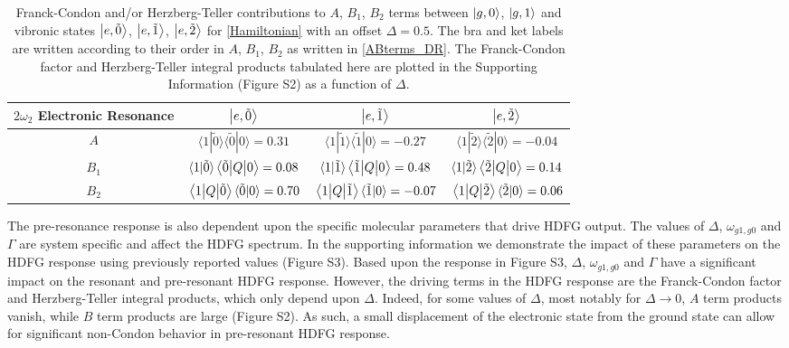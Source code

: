 \documentclass[aip, jcp, reprint, onecolumn, nofootinbib]{revtex4-2}
\begin{document}
\begin{table}[!htbp]
	\caption{\label{T:contributions} Franck-Condon and/or Herzberg-Teller contributions to $A$, $B_1$, $B_2$ terms between $\ket{g,0}$, $\ket{g,1}$ and vibronic states $\ket{e,\tilde{0}}$, $\ket{e,\tilde{1}}$, $\ket{e,\tilde{2}}$ for \autoref{Hamiltonian} with an offset $\Delta = 0.5$.
	The bra and ket labels are written according to their order in $A$, $B_1$, $B_2$ as written in \autoref{ABterms_DR}.
	The Franck-Condon factor and Herzberg-Teller integral products tabulated here are plotted in the Supporting Information (Figure S2) as a function of $\Delta$.}
	\begin{ruledtabular}
		\begin{tabular}{cccc}\label{fcht}
			$2\omega_2$ Electronic Resonance & $\ket{e,\tilde{0}}$ & $\ket{e,\tilde{1}}$ & $\ket{e,\tilde{2}}$\\
			\hline  
			$A$ 
			& $\langle 1 | \tilde{0} \rangle \langle \tilde{0} | 0 \rangle = 0.31 $  
			& $\langle 1 | \tilde{1} \rangle \langle \tilde{1} | 0 \rangle = -0.27 $ 
			& $\langle 1 | \tilde{2} \rangle \langle \tilde{2} | 0 \rangle = -0.04$\\
					
			$B_1$ 
			& $\langle 1 | \tilde{0} \rangle \mel{\tilde{0}}{Q}{0} = 0.08$ 
			& $\langle 1 | \tilde{1} \rangle \mel{\tilde{1}}{Q}{0} = 0.48$ 
			&$\langle 1 | \tilde{2} \rangle \mel{\tilde{2}}{Q}{0} = 0.14$\\
						
			$B_2$ 
			& $\mel{1}{Q}{\tilde{0}} \langle \tilde{0} | 0 \rangle = 0.70$  
			& $\mel{1}{Q}{\tilde{1}} \langle \tilde{1} | 0 \rangle = -0.07$ 
			& $\mel{1}{Q}{\tilde{2}} \langle \tilde{2} | 0 \rangle = 0.06$\\
		\end{tabular}
	\end{ruledtabular}
\end{table}

The pre-resonance response is also dependent upon the specific molecular parameters that drive HDFG output.
The values of $\Delta$, $\omega_{g1, g0}$ and $\Gamma$ are system specific and affect the HDFG spectrum.
In the supporting information we demonstrate the impact of these parameters on the HDFG response using previously reported values (Figure S3). \cite{Myers1982, Brennan2024}
Based upon the response in Figure S3, $\Delta$, $\omega_{g1, g0}$ and $\Gamma$ have a significant impact on the resonant and pre-resonant HDFG response.
However, the driving terms in the HDFG response are the Franck-Condon factor and Herzberg-Teller integral products, which only depend upon $\Delta$.
Indeed, for some values of $\Delta$, most notably for $\Delta \rightarrow 0$, $A$ term products vanish, while $B$ term products are large (Figure S2).
As such, a small displacement of the electronic state from the ground state can allow for significant non-Condon behavior in pre-resonant HDFG response.
\end{document}
